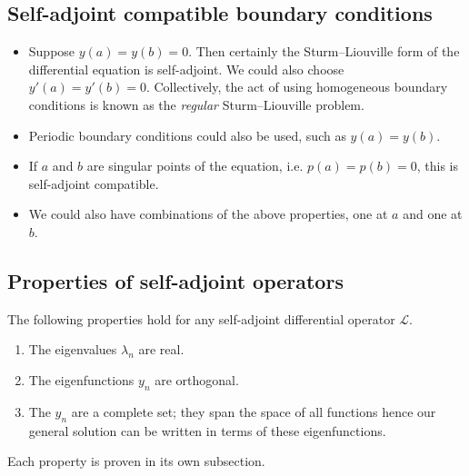 \subsection{Self-adjoint compatible boundary conditions}
\begin{itemize}
	\item Suppose \( y(a) = y(b) = 0 \).
	      Then certainly the Sturm--Liouville form of the differential equation is self-adjoint.
	      We could also choose \( y'(a) = y'(b) = 0 \).
	      Collectively, the act of using homogeneous boundary conditions is known as the \textit{regular} Sturm--Liouville problem.
	\item Periodic boundary conditions could also be used, such as \( y(a) = y(b) \).
	\item If \( a \) and \( b \) are singular points of the equation, i.e.
	      \( p(a) = p(b) = 0 \), this is self-adjoint compatible.
	\item We could also have combinations of the above properties, one at \( a \) and one at \( b \).
\end{itemize}

\subsection{Properties of self-adjoint operators}
The following properties hold for any self-adjoint differential operator \( \mathcal L \).
\begin{enumerate}
	\item The eigenvalues \( \lambda_n \) are real.
	\item The eigenfunctions \( y_n \) are orthogonal.
	\item The \( y_n \) are a complete set; they span the space of all functions hence our general solution can be written in terms of these eigenfunctions.
\end{enumerate}
Each property is proven in its own subsection.

